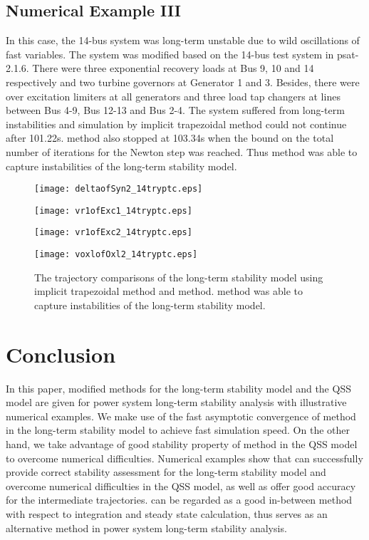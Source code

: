 \documentclass[journal]{IEEEtran}
\begin{document}
\subsection{Numerical Example III}
In this case, the 14-bus system was long-term unstable due to wild oscillations of fast variables. The system was modified based on the 14-bus test system in psat-2.1.6\cite{Milano:article}. There were three exponential recovery loads at Bus 9, 10 and 14 respectively and two turbine governors at Generator 1 and 3. Besides, there were over excitation limiters at all generators and three load tap changers at lines between Bus 4-9, Bus 12-13 and Bus 2-4. 
The system suffered from long-term instabilities and simulation by implicit trapezoidal method could not continue after 101.22s.  method also stopped at 103.34s when the bound on the total number of iterations for the Newton step was reached. Thus  method was able to capture instabilities of the long-term stability model.
\begin{figure}[!ht]
\centering
\begin{minipage}[t]{0.5\linewidth}
\texttt{[image: deltaofSyn2\_14tryptc.eps]}
\end{minipage}\begin{minipage}[t]{0.5\linewidth}
\texttt{[image: vr1ofExc1\_14tryptc.eps]}
\end{minipage}
\begin{minipage}[t]{0.5\linewidth}
\texttt{[image: vr1ofExc2\_14tryptc.eps]}
\end{minipage}\begin{minipage}[t]{0.5\linewidth}
\texttt{[image: voxlofOxl2\_14tryptc.eps]}
\end{minipage}
\caption{The trajectory comparisons of the long-term stability model using implicit trapezoidal method and  method.  method was able to capture instabilities of the long-term stability model.}\label{my14completeqss_try}
\end{figure}

\section{Conclusion}\label{sectionconclusion}
In this paper, modified  methods for the long-term stability model and the QSS model are given for power system long-term stability analysis with illustrative numerical examples. We make use of the fast asymptotic convergence of  method in the long-term stability model to achieve fast simulation speed. On the other hand, we take advantage of good stability property of  method in the QSS model to overcome numerical difficulties. Numerical examples show that   can successfully provide correct stability assessment for the long-term stability model and overcome numerical difficulties in the QSS model, as well as offer good accuracy for the intermediate trajectories.  can be regarded as a good in-between method with respect to integration and steady state calculation, thus serves as an alternative method in power system long-term stability analysis.
\end{document}
